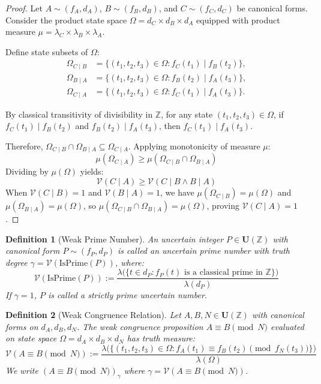\documentclass[a4paper,14pt, twoside]{memoir}
\newtheorem{definition}{Definition}[chapter]
\newcommand{\tsbd}[1]{\mathbf{U}(\mathbb{#1})}
\newcommand{\ddclmd}{\mathcal{V}} %
\begin{document}
	\begin{proof}
		Let $A \sim (f_A, d_A)$, $B \sim (f_B, d_B)$, and $C \sim (f_C, d_C)$ be canonical forms. Consider the product state space $\Omega = d_C \times d_B \times d_A$ equipped with product measure $\mu = \lambda_C \times \lambda_B \times \lambda_A$.
		
		Define state subsets of $\Omega$:
		\begin{align*}
			\Omega_{C \mid B} &= \{(t_1, t_2, t_3) \in \Omega : f_C(t_1) \mid f_B(t_2)\}, \\
			\Omega_{B \mid A} &= \{(t_1, t_2, t_3) \in \Omega : f_B(t_2) \mid f_A(t_3)\}, \\
			\Omega_{C \mid A} &= \{(t_1, t_2, t_3) \in \Omega : f_C(t_1) \mid f_A(t_3)\}.
		\end{align*}
		
		By classical transitivity of divisibility in $\mathbb{Z}$, for any state $(t_1, t_2, t_3) \in \Omega$, if $f_C(t_1) \mid f_B(t_2)$ and $f_B(t_2) \mid f_A(t_3)$, then $f_C(t_1) \mid f_A(t_3)$.
		
		Therefore, $\Omega_{C \mid B} \cap \Omega_{B \mid A} \subseteq \Omega_{C \mid A}$. Applying monotonicity of measure $\mu$:
		\[
		\mu(\Omega_{C \mid A}) \ge \mu(\Omega_{C \mid B} \cap \Omega_{B \mid A})
		\]
		Dividing by $\mu(\Omega)$ yields:
		\[
		\ddclmd(C \mid A) \ge \ddclmd(C \mid B \land B \mid A)
		\]
		When $\ddclmd(C \mid B) = 1$ and $\ddclmd(B \mid A) = 1$, we have $\mu(\Omega_{C \mid B}) = \mu(\Omega)$ and $\mu(\Omega_{B \mid A}) = \mu(\Omega)$, so $\mu(\Omega_{C \mid B} \cap \Omega_{B \mid A}) = \mu(\Omega)$, proving $\ddclmd(C \mid A) = 1$.
	\end{proof}
	
	\begin{definition}[Weak Prime Number]
		An uncertain integer $P \in \tsbd{Z}$ with canonical form $P \sim (f_P, d_P)$ is called an uncertain prime number with truth degree $\gamma = \ddclmd(\text{IsPrime}(P))$, where:
		\[
		\ddclmd(\text{IsPrime}(P)) := \frac{\lambda\big(\{t \in d_P : f_P(t) \text{ is a classical prime in } \mathbb{Z}\}\big)}{\lambda(d_P)}
		\]
		If $\gamma = 1$, $P$ is called a strictly prime uncertain number.
	\end{definition}
	
	\begin{definition}[Weak Congruence Relation]
		Let $A, B, N \in \tsbd{Z}$ with canonical forms on $d_A, d_B, d_N$. The weak congruence proposition $A \equiv B \pmod N$ evaluated on state space $\Omega = d_A \times d_B \times d_N$ has truth measure:
		\[
		\ddclmd(A \equiv B \pmod N) := \frac{\lambda\big(\{(t_1, t_2, t_3) \in \Omega : f_A(t_1) \equiv f_B(t_2) \pmod{f_N(t_3)}\}\big)}{\lambda(\Omega)}
		\]
		We write $(A \equiv B \pmod N)_\gamma$ where $\gamma = \ddclmd(A \equiv B \pmod N)$.
	\end{definition}
	
\end{document}

